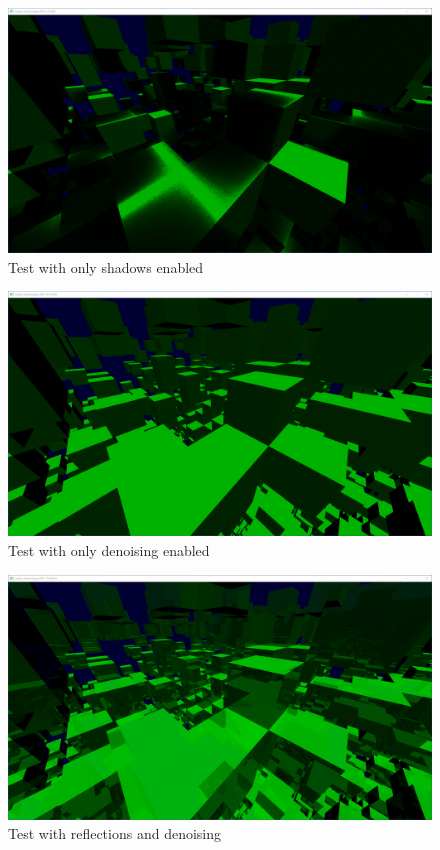 \documentclass[times, utf8, zavrsni, numeric]{fer}
\begin{document}
\begin{center}
\begin{figure}[H]
\includegraphics[width=1\textwidth]{tests/shadows_only.png}
\caption{Test with only shadows enabled}
\end{figure}
\end{center}

\begin{center}
\begin{figure}[H]
\includegraphics[width=1\textwidth]{tests/denoising_only.png}
\caption{Test with only denoising enabled}
\end{figure}
\end{center}

\begin{center}
\begin{figure}[H]
\includegraphics[width=1\textwidth]{tests/reflections+denoising.png}
\caption{Test with reflections and denoising}
\end{figure}
\end{center}
\end{document}
